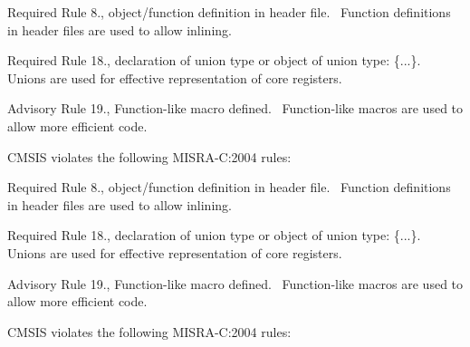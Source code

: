 \begin{DoxyItemize}
\item Required Rule 8., object/function definition in header file.~\newline
 Function definitions in header files are used to allow \textquotesingle{}inlining\textquotesingle{}.\end{DoxyItemize}
\begin{DoxyItemize}
\item Required Rule 18., declaration of union type or object of union type\+: \textquotesingle{}\{...\}\textquotesingle{}.~\newline
 Unions are used for effective representation of core registers.\end{DoxyItemize}
\begin{DoxyItemize}
\item Advisory Rule 19., Function-\/like macro defined.~\newline
 Function-\/like macros are used to allow more efficient code.\end{DoxyItemize}


CMSIS violates the following MISRA-\/C\+:2004 rules\+:

\begin{DoxyItemize}
\item Required Rule 8., object/function definition in header file.~\newline
 Function definitions in header files are used to allow \textquotesingle{}inlining\textquotesingle{}.\end{DoxyItemize}
\begin{DoxyItemize}
\item Required Rule 18., declaration of union type or object of union type\+: \textquotesingle{}\{...\}\textquotesingle{}.~\newline
 Unions are used for effective representation of core registers.\end{DoxyItemize}
\begin{DoxyItemize}
\item Advisory Rule 19., Function-\/like macro defined.~\newline
 Function-\/like macros are used to allow more efficient code.\end{DoxyItemize}


CMSIS violates the following MISRA-\/C\+:2004 rules\+:

